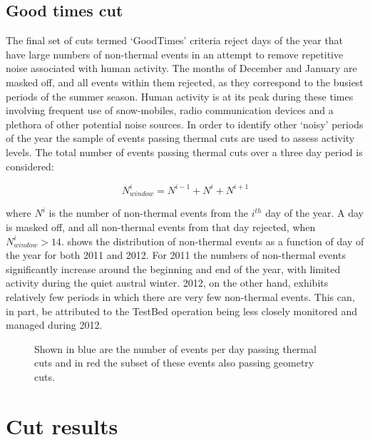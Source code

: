 \subsection{Good times cut}
\label{sec:Analysis:Anthropogenic-Cuts:Good-Times}
The final set of cuts termed `GoodTimes' criteria reject days of the year that have large numbers of non-thermal events in an attempt to remove repetitive noise associated with human activity. The months of December and January are masked off, and all events within them rejected, as they correspond to the busiest periods of the summer season. Human activity is at its peak during these times involving frequent use of snow-mobiles, radio communication devices and a plethora of other potential noise sources. In order to identify other `noisy' periods of the year the sample of events passing thermal cuts are used to assess activity levels. The total number of events passing thermal cuts over a three day period is considered:

\begin{equation}
  N^{i}_{window} = N^{i-1} + N^{i} + N^{i+1}
\end{equation}

\noindent where $N^{i}$ is the number of non-thermal events from the $i^{th}$ day of the year. A day is masked off, and all non-thermal events from that day rejected, when $N^{i}_{window} > 14$.  shows the distribution of non-thermal events as a function of day of the year for both 2011 and 2012. For 2011 the numbers of non-thermal events significantly increase around the beginning and end of the year, with limited activity during the quiet austral winter. 2012, on the other hand, exhibits relatively few periods in which there are very few non-thermal events. This can, in part, be attributed to the TestBed operation being less closely monitored and managed during 2012.

\begin{figure}[htpb]
\hfill
{}
\caption{Shown in blue are the number of events per day passing thermal cuts and in red the subset of these events also passing geometry cuts.}
\label{fig:Analysis:Anthropogenic-Cuts:GoodTimes:Event-Rate}
\end{figure}

\section{Cut results}
\label{sec:Analysis:Cut-Results}

